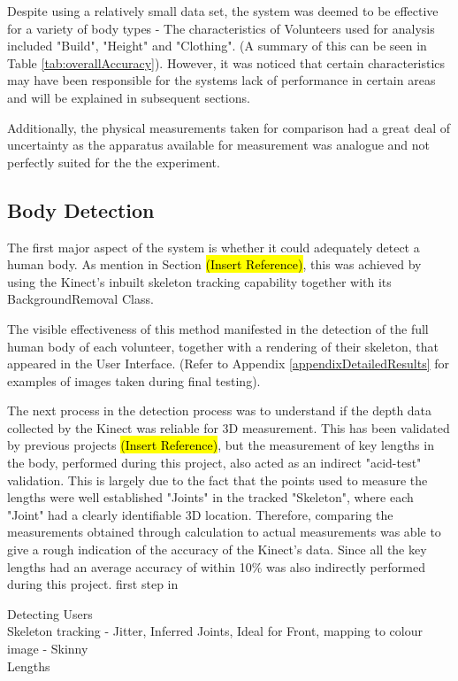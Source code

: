 Despite using a relatively small data set, the system was deemed to be effective for a variety of body types - The characteristics of Volunteers used for analysis included "Build", "Height" and "Clothing". (A summary of this can be seen in Table \ref{tab:overallAccuracy}). However, it was noticed that certain characteristics may have been responsible for the systems lack of performance in certain areas and will be explained in subsequent sections.

Additionally, the physical measurements taken for comparison had a great deal of uncertainty as the apparatus available for measurement was analogue and not perfectly suited for the the experiment. 

\subsection{Body Detection}
The first major aspect of the system is whether it could adequately detect a human body. As mention in Section \hl{(Insert Reference)}, this was achieved by using the Kinect's inbuilt skeleton tracking capability together with its BackgroundRemoval Class.

The visible effectiveness of this method manifested in the detection of the full human body of each volunteer, together with a rendering of their skeleton, that appeared in the User Interface. (Refer to Appendix \ref{appendixDetailedResults} for examples of images taken during final testing). 

The next process in the detection process was to understand if the depth data collected by the Kinect was reliable for 3D measurement. This has been validated by previous projects \hl{(Insert Reference)}, but the measurement of key lengths in the body, performed during this project, also acted as an indirect "acid-test" validation. This is largely due to the fact that the points used to measure the lengths were well established "Joints" in the tracked "Skeleton", where each "Joint" had a clearly identifiable 3D location. Therefore, comparing the measurements obtained through calculation to actual measurements was able to give a rough indication of the accuracy of the Kinect's data. Since all the key lengths had an average accuracy of within 10\% was also indirectly performed during this project.  first step in 

Detecting Users\\
Skeleton tracking - Jitter, Inferred Joints, Ideal for Front, mapping to colour image - Skinny\\
Lengths\\


